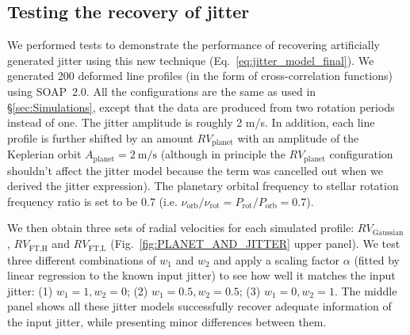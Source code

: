 \subsection{Testing the recovery of jitter}
\label{sec:check}

We performed tests to demonstrate the performance of recovering artificially generated jitter using this new technique (Eq.~\ref{eq:jitter_model_final}). We generated 200 deformed line profiles (in the form of cross-correlation functions) using SOAP~2.0. All the configurations are the same as used in \S\ref{sec:Simulations}, except that the data are produced from two rotation periods instead of one. The jitter amplitude is roughly 2 m/s. In addition, each line profile is further shifted by an amount $RV_\text{planet}$ with an amplitude of the Keplerian orbit $A_\text{planet} = 2~\text{m/s}$ (although in principle the $RV_\text{planet}$ configuration shouldn't affect the jitter model because the term was cancelled out when we derived the jitter expression). The planetary orbital frequency to stellar rotation frequency ratio is set to be 0.7 (i.e. $\nu_\text{orb}/\nu_\text{rot} = P_\text{rot}/P_\text{orb} = 0.7$). 

We then obtain three sets of radial velocities for each simulated profile: $RV_\text{Gaussian}$, $RV_\text{FT,H}$ and $RV_\text{FT,L}$ (Fig.~\ref{fig:PLANET_AND_JITTER} upper panel). We test three different combinations of $w_1$ and $w_2$ and apply a scaling factor $\alpha$ (fitted by linear regression to the known input jitter) to see how well it matches the input jitter: (1) $w_1=1, w_2=0$; (2) $w_1=0.5, w_2=0.5$; (3) $w_1=0, w_2=1$. The middle panel shows all these jitter models successfully recover adequate information of the input jitter, while presenting minor differences between them. 

